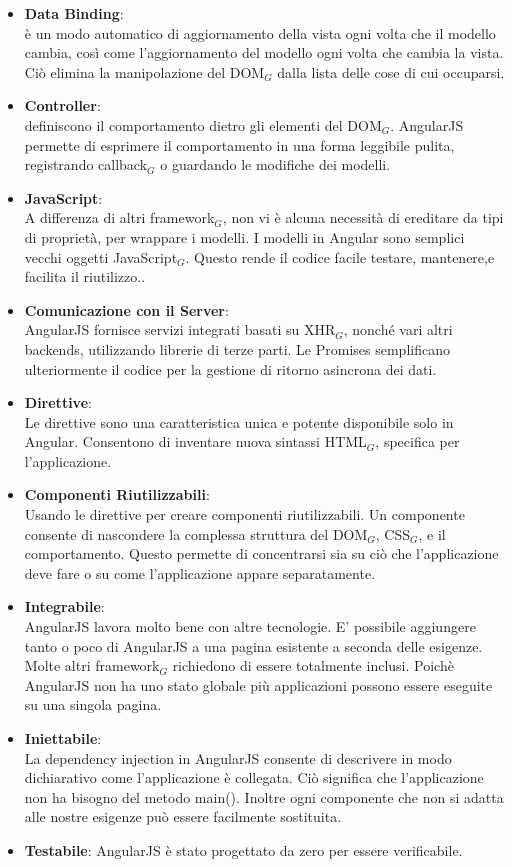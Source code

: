 \begin{itemize}
	\item \textbf{Data Binding}:\\
	è un modo automatico di aggiornamento della vista ogni volta che il modello cambia, così come l'aggiornamento del modello ogni volta che cambia la vista. Ciò  elimina la manipolazione del DOM$_G$ dalla lista delle cose di cui occuparsi.
	\item \textbf{Controller}:\\
	definiscono il comportamento dietro gli elementi del DOM$_G$. AngularJS permette di esprimere il comportamento in una forma leggibile pulita, registrando callback$_G$ o guardando le modifiche dei modelli.
	\item \textbf{JavaScript}:\\
	A differenza di altri framework$_G$, non vi è alcuna necessità di ereditare da tipi di proprietà, per wrappare i modelli. I modelli in Angular sono semplici vecchi oggetti JavaScript$_G$. Questo rende il codice facile testare, mantenere,e facilita il riutilizzo..
	\item \textbf{ Comunicazione con il Server}:\\
	AngularJS fornisce servizi integrati basati su XHR$_G$, nonché vari altri backends, utilizzando librerie di terze parti. Le Promises semplificano ulteriormente il codice per la gestione di ritorno asincrona dei dati.
	\item \textbf{ Direttive}:\\
	Le direttive sono una caratteristica unica e potente disponibile solo in Angular. Consentono di inventare nuova sintassi HTML$_G$, specifica per l'applicazione.
	\item \textbf{ Componenti Riutilizzabili}:\\
	Usando le direttive per creare componenti riutilizzabili. Un componente consente di nascondere la complessa struttura del DOM$_G$, CSS$_G$, e il comportamento. Questo permette di concentrarsi sia su ciò che l'applicazione deve fare o su come l'applicazione appare separatamente.
	\item \textbf{ Integrabile}:\\
	AngularJS lavora molto bene con altre tecnologie. E' possibile aggiungere tanto o poco di AngularJS a una pagina esistente a seconda delle esigenze. Molte altri framework$_G$ richiedono di essere totalmente inclusi. Poichè AngularJS non ha uno stato globale più applicazioni possono essere eseguite su una singola pagina.
	\item \textbf{ Iniettabile}:\\
	La dependency injection in AngularJS consente di descrivere in modo dichiarativo come l'applicazione è collegata. Ciò significa che l'applicazione non ha bisogno del metodo main(). Inoltre ogni componente che non si adatta alle nostre esigenze può essere facilmente sostituita.
	\item \textbf{ Testabile}:
	AngularJS è stato progettato da zero per essere verificabile.
\end{itemize}

